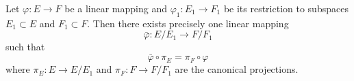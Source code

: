 Let $\varphi: E \to F$ be a linear mapping and $\varphi_1: E_1 \to F_1$ be its restriction to subspaces $E_1 \subset E$ and $F_1 \subset F$. Then there exists precisely one linear mapping
$$\bar{\varphi}: E/E_1 \to F/F_1$$
such that
$$\bar{\varphi} \circ \pi_E = \pi_F \circ \varphi$$
where $\pi_E: E \to E/E_1$ and $\pi_F: F \to F/F_1$ are the canonical projections.
